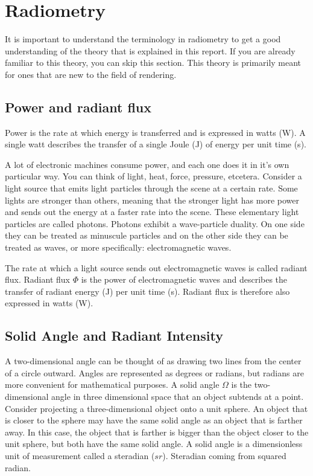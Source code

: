 \documentclass[11pt,a4paper]{report}
\begin{document}
\section{Radiometry}
It is important to understand the terminology in radiometry to get a good understanding of the theory that is explained in this report. If you are already familiar to this theory, you can skip this section. This theory is primarily meant for ones that are new to the field of rendering. 

\subsection{Power and radiant flux}

Power is the rate at which energy is transferred and is expressed in watts (W). A single watt describes the transfer of a single Joule (J) of energy per unit time (s).

A lot of electronic machines consume power, and each one does it in it's own particular way. You can think of light, heat, force, pressure, etcetera. Consider a light source that emits light particles through the scene at a certain rate. Some lights are stronger than others, meaning that the stronger light has more power and sends out the energy at a faster rate into the scene. These elementary light particles are called photons. Photons exhibit a wave-particle duality. On one side they can be treated as minuscule particles and on the other side they can be treated as waves, or more specifically: electromagnetic waves.

The rate at which a light source sends out electromagnetic waves is called radiant flux. Radiant flux $\Phi$ is the power of electromagnetic waves and describes the transfer of radiant energy (J) per unit time (s). Radiant flux is therefore also expressed in watts (W).

\subsection{Solid Angle and Radiant Intensity}

A two-dimensional angle can be thought of as drawing two lines from the center of a circle outward. Angles are represented as degrees or radians, but radians are more convenient for mathematical purposes. A solid angle $\Omega$ is the two-dimensional angle in three dimensional space that an object subtends at a point. Consider projecting a three-dimensional object onto a unit sphere. An object that is closer to the sphere may have the same solid angle as an object that is farther away. In this case, the object that is farther is bigger than the object closer to the unit sphere, but both have the same solid angle. A solid angle is a dimensionless unit of measurement called a steradian ($sr$). Steradian coming from squared radian.\\
\end{document}
